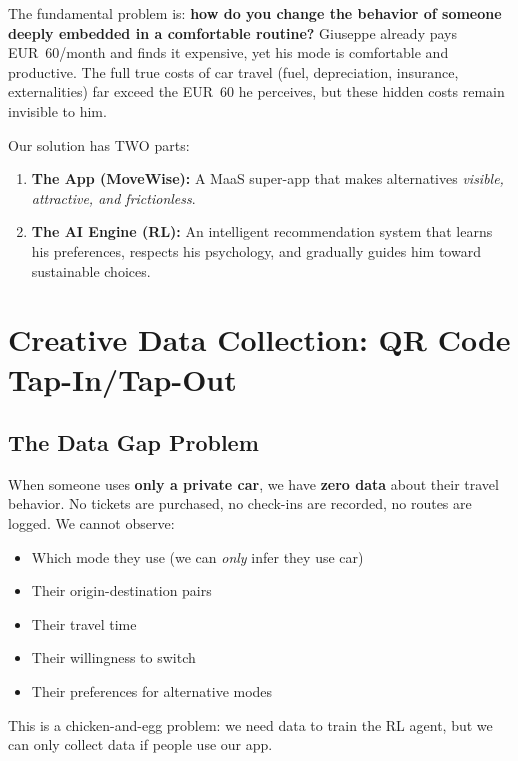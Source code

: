\documentclass[11pt,a4paper]{article}
\begin{document}
The fundamental problem is: \textbf{how do you change the behavior of someone deeply embedded in a comfortable routine?} Giuseppe already pays EUR~60/month and finds it expensive, yet his mode is comfortable and productive. The full true costs of car travel (fuel, depreciation, insurance, externalities) far exceed the EUR~60 he perceives, but these hidden costs remain invisible to him.

Our solution has TWO parts:
\begin{enumerate}
    \item \textbf{The App (MoveWise):} A MaaS super-app that makes alternatives \textit{visible, attractive, and frictionless}.
    \item \textbf{The AI Engine (RL):} An intelligent recommendation system that learns his preferences, respects his psychology, and gradually guides him toward sustainable choices.
\end{enumerate}

\section{Creative Data Collection: QR Code Tap-In/Tap-Out}
\label{sec:data}

\subsection{The Data Gap Problem}

\begin{tcolorbox}[colback=lightred,colframe=deepred,title=\textbf{The Fundamental Data Challenge}]
When someone uses \textbf{only a private car}, we have \textbf{zero data} about their travel behavior. No tickets are purchased, no check-ins are recorded, no routes are logged. We cannot observe:
\begin{itemize}[noitemsep]
    \item Which mode they use (we can \textit{only} infer they use car)
    \item Their origin-destination pairs
    \item Their travel time
    \item Their willingness to switch
    \item Their preferences for alternative modes
\end{itemize}
This is a chicken-and-egg problem: we need data to train the RL agent, but we can only collect data if people use our app.
\end{tcolorbox}
\end{document}
